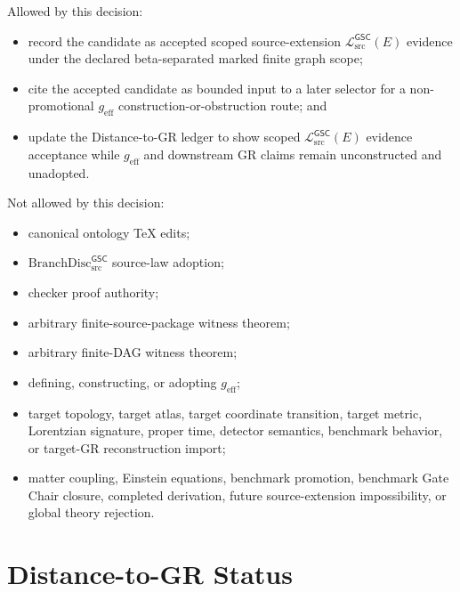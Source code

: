 \documentclass[11pt]{article}
\newcommand{\BranchDisc}{\mathrm{BranchDisc}_{\mathrm{src}}^{\mathsf{GSC}}}
\newcommand{\MetricData}{\mathcal{L}_{\mathrm{src}}^{\mathsf{GSC}}}
\newcommand{\geff}{g_{\mathrm{eff}}}
\begin{document}
Allowed by this decision:
\begin{itemize}[leftmargin=*]
  \item record the candidate as accepted scoped source-extension
  \(\MetricData(E)\) evidence under the declared beta-separated marked finite
  graph scope;
  \item cite the accepted candidate as bounded input to a later selector for a
  non-promotional \(\geff\) construction-or-obstruction route; and
  \item update the Distance-to-GR ledger to show scoped \(\MetricData(E)\)
  evidence acceptance while \(\geff\) and downstream GR claims remain
  unconstructed and unadopted.
\end{itemize}

Not allowed by this decision:
\begin{itemize}[leftmargin=*]
  \item canonical ontology TeX edits;
  \item \(\BranchDisc\) source-law adoption;
  \item checker proof authority;
  \item arbitrary finite-source-package witness theorem;
  \item arbitrary finite-DAG witness theorem;
  \item defining, constructing, or adopting \(\geff\);
  \item target topology, target atlas, target coordinate transition, target
  metric, Lorentzian signature, proper time, detector semantics, benchmark
  behavior, or target-GR reconstruction import;
  \item matter coupling, Einstein equations, benchmark promotion, benchmark
  Gate Chair closure, completed derivation, future source-extension
  impossibility, or global theory rejection.
\end{itemize}

\section{Distance-to-GR Status}
\end{document}
